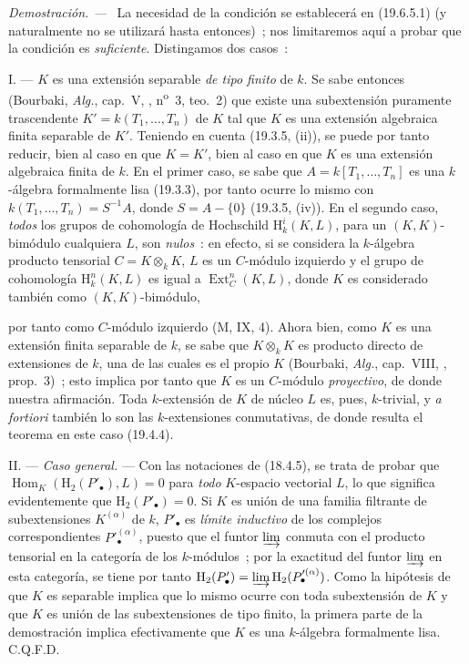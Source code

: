 \documentclass[10pt,oneside]{book}
\newcommand{\oldpage}[2][]{%
  \setcounter{footnote}{0}%
  \marginpar{\scriptsize\textbf{#1}~|~#2}\ignorespaces}
\newenvironment{proof}{%
  \par\medskip\noindent\textit{Demostración. ---\ }}{\par}
\providecommand{\setmin}{-}%
\begin{document}
\begin{proof}
La necesidad de la condición se establecerá en (19.6.5.1) (y naturalmente no
se utilizará hasta entonces)~; nos limitaremos aquí a probar que la
condición es \emph{suficiente}. Distingamos dos casos~:

I. --- $K$ es una extensión separable \emph{de tipo finito} de $k$. Se sabe
entonces (Bourbaki, \emph{Alg.}, cap.~V, ,
n\textsuperscript{o}~3, teo.~2) que existe una subextensión puramente trascendente
$K'=k(T_1,\ldots,T_n)$ de $K$ tal que $K$ es una extensión algebraica
finita separable de $K'$. Teniendo en cuenta (19.3.5, (ii)), se puede por tanto
reducir, bien al caso en que $K=K'$, bien al caso en que $K$ es una extensión algebraica finita de $k$.
En el primer caso, se sabe que $A=k[T_1,\ldots,T_n]$ es una $k$-álgebra
formalmente lisa (19.3.3), por tanto ocurre lo mismo con
$k(T_1,\ldots,T_n)=S^{-1}A$, donde $S=A\setmin\{0\}$ (19.3.5, (iv)). En el segundo
caso, \emph{todos} los grupos de cohomología de Hochschild
$\mathrm H_k^i(K,L)$, para un $(K,K)$-bimódulo cualquiera $L$, son \emph{nulos}~: en
efecto, si se considera la $k$-álgebra producto tensorial $C=K\otimes_k K$,
$L$ es un $C$-módulo izquierdo y el grupo de cohomología
$\mathrm H_k^n(K,L)$ es igual a $\operatorname{Ext}_C^n(K,L)$, donde $K$ es
considerado también como $(K,K)$-bimódulo,

\oldpage[0\textsubscript{IV-1}]{101}

por tanto como $C$-módulo izquierdo (M, IX, 4). Ahora bien, como $K$ es una extensión
finita separable de $k$, se sabe que $K\otimes_k K$ es producto directo
de extensiones de $k$, una de las cuales es el propio $K$ (Bourbaki, \emph{Alg.},
cap.~VIII, , prop.~3)~; esto implica por tanto que $K$ es un
$C$-módulo \emph{proyectivo}, de donde nuestra afirmación. Toda $k$-extensión de $K$
de núcleo $L$ es, pues, $k$-trivial, y \emph{a fortiori} también lo son las
$k$-extensiones conmutativas, de donde resulta el teorema en este caso (19.4.4).

II. --- \emph{Caso general.} --- Con las notaciones de (18.4.5), se trata de
probar que $\operatorname{Hom}_K(\mathrm H_2(P'_\bullet),L)=0$ para
\emph{todo} $K$-espacio vectorial $L$, lo que significa evidentemente que
$\mathrm H_2(P'_\bullet)=0$. Si $K$ es unión de una familia filtrante de
subextensiones $K^{(\alpha)}$ de $k$, $P'_\bullet$ es \emph{límite
inductivo} de los complejos correspondientes $P'^{(\alpha)}_\bullet$, puesto que el
funtor $\varinjlim$ conmuta con el producto tensorial en la categoría de los
$k$-módulos~; por la exactitud del funtor $\varinjlim$ en esta categoría,
se tiene por tanto
$\mathrm H_2(P'_\bullet)=\varinjlim\mathrm H_2(P'^{(\alpha)}_\bullet)$.
Como la hipótesis de que $K$ es separable implica que lo mismo ocurre con toda
subextensión de $K$ y que $K$ es unión de las subextensiones de tipo finito,
la primera parte de la demostración implica efectivamente que $K$ es una
$k$-álgebra formalmente lisa. C.Q.F.D.
\end{proof}
\end{document}
